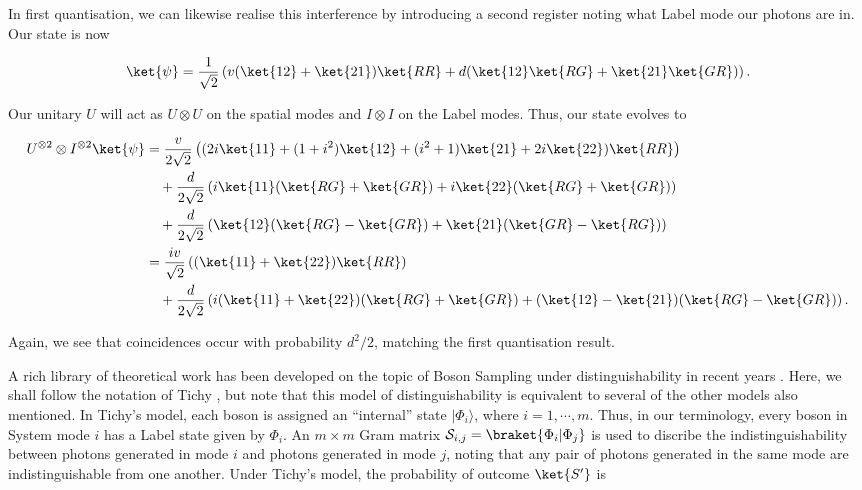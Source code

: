 In first quantisation, we can likewise realise this interference by introducing a second register noting what Label mode our photons are in. Our state is now

\begin{equation}
\ket{\psi} = \frac{1}{\sqrt{2}}\left(v(\ket{12}+\ket{21})\ket{RR}+d(\ket{12}\ket{RG} + \ket{21}\ket{GR})\right).
\end{equation}

Our unitary $U$ will act as $U\otimes U$ on the spatial modes and $I\otimes I$ on the Label modes. Thus, our state evolves to

\begin{align}
U^{\otimes 2}\otimes I^{\otimes 2}\ket{\psi} &= \frac{v}{2\sqrt{2}}\left((2i\ket{11}+(1+i^2)\ket{12}+(i^2+1)\ket{21}+2i\ket{22})\ket{RR}\right)\nonumber\\
&\quad+\frac{d}{2\sqrt{2}}\left(i\ket{11}(\ket{RG}+\ket{GR})+i\ket{22}(\ket{RG}+\ket{GR})\right)\nonumber\\
&\quad+\frac{d}{2\sqrt{2}}\left(\ket{12}(\ket{RG}-\ket{GR})+\ket{21}(\ket{GR}-\ket{RG})\right)\\
&= \frac{iv}{\sqrt{2}}\left((\ket{11}+\ket{22})\ket{RR}\right)\nonumber\\
&\quad+\frac{d}{2\sqrt{2}}\left(i(\ket{11}+\ket{22})(\ket{RG}+\ket{GR})+(\ket{12}-\ket{21})(\ket{RG}-\ket{GR})\right).
\end{align}

Again, we see that coincidences occur with probability $d^2/2$, matching the first quantisation result.

A rich library of theoretical work has been developed on the topic of Boson Sampling under distinguishability in recent years \cite{rohde2015, shchesnovich2015, tichy2015, tamma2016nonidentical, menssen2017}. Here, we shall follow the notation of Tichy \cite{tichy2015}, but note that this model of distinguishability is equivalent to several of the other models also mentioned. In Tichy's model, each boson is assigned an ``internal'' state $|\Phi_i\rangle$, where $i=1, \cdots, m$.
Thus, in our terminology, every boson in System mode $i$ has a Label state given by $\Phi_i$. An $m\times m$ Gram matrix $\mathcal{S}_{i,j}=\braket{\Phi_i|\Phi_j}$ is used to discribe the indistinguishability between photons generated in mode $i$ and photons generated in mode $j$, noting that any pair of photons generated in the same mode are indistinguishable from one another. Under Tichy's model, the probability of outcome $\ket{S'}$ is

